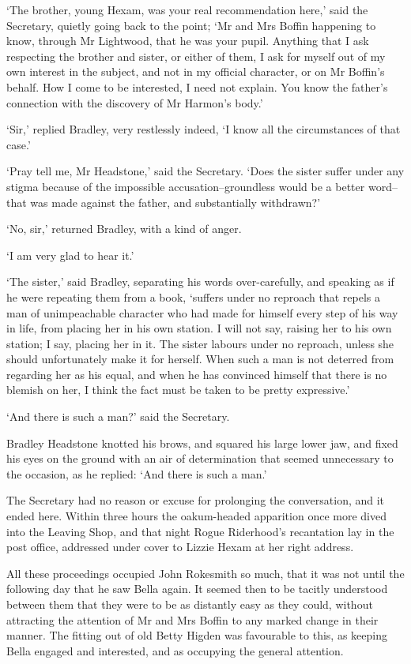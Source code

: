 ‘The brother, young Hexam, was your real recommendation here,’ said the
Secretary, quietly going back to the point; ‘Mr and Mrs Boffin happening
to know, through Mr Lightwood, that he was your pupil. Anything that
I ask respecting the brother and sister, or either of them, I ask for
myself out of my own interest in the subject, and not in my official
character, or on Mr Boffin’s behalf. How I come to be interested, I need
not explain. You know the father’s connection with the discovery of Mr
Harmon’s body.’

‘Sir,’ replied Bradley, very restlessly indeed, ‘I know all the
circumstances of that case.’

‘Pray tell me, Mr Headstone,’ said the Secretary. ‘Does the sister
suffer under any stigma because of the impossible accusation--groundless
would be a better word--that was made against the father, and
substantially withdrawn?’

‘No, sir,’ returned Bradley, with a kind of anger.

‘I am very glad to hear it.’

‘The sister,’ said Bradley, separating his words over-carefully, and
speaking as if he were repeating them from a book, ‘suffers under no
reproach that repels a man of unimpeachable character who had made
for himself every step of his way in life, from placing her in his own
station. I will not say, raising her to his own station; I say, placing
her in it. The sister labours under no reproach, unless she should
unfortunately make it for herself. When such a man is not deterred from
regarding her as his equal, and when he has convinced himself that
there is no blemish on her, I think the fact must be taken to be pretty
expressive.’

‘And there is such a man?’ said the Secretary.

Bradley Headstone knotted his brows, and squared his large lower jaw,
and fixed his eyes on the ground with an air of determination that
seemed unnecessary to the occasion, as he replied: ‘And there is such a
man.’

The Secretary had no reason or excuse for prolonging the conversation,
and it ended here. Within three hours the oakum-headed apparition once
more dived into the Leaving Shop, and that night Rogue Riderhood’s
recantation lay in the post office, addressed under cover to Lizzie
Hexam at her right address.

All these proceedings occupied John Rokesmith so much, that it was not
until the following day that he saw Bella again. It seemed then to be
tacitly understood between them that they were to be as distantly easy
as they could, without attracting the attention of Mr and Mrs Boffin to
any marked change in their manner. The fitting out of old Betty Higden
was favourable to this, as keeping Bella engaged and interested, and as
occupying the general attention.

